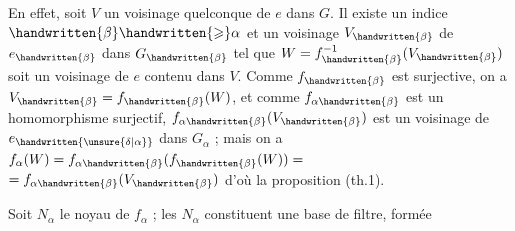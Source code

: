 En effet, soit $V$ un voisinage quelconque de $e$ dans $G$. Il existe un
indice $\handwritten{\beta}\handwritten{\geqslant}\alpha$ et un voisinage $V_{\handwritten{\beta}}$ de $e_{\handwritten{\beta}}$ dans $G_{\handwritten{\beta}}$ tel que $W=f^{-1}_{\handwritten{\beta}}(V_{\handwritten{\beta}})$
soit un voisinage de $e$ contenu dans $V$. Comme $f_{\handwritten{\beta}}$ est surjective, on a
$V_{\handwritten{\beta}}=f_{\handwritten{\beta}}(W)$, et comme $f_{\alpha\handwritten{\beta}}$ est un homomorphisme surjectif, $f_{\alpha\handwritten{\beta}}(V_{\handwritten{\beta}})$
est un voisinage de $e_{\handwritten{\unsure{\delta|\alpha}}}$ dans $G_\alpha$ ; mais on a $f_\alpha(W)=f_{\alpha\handwritten{\beta}}(f_{\handwritten{\beta}}(W))=$
$=f_{\alpha\handwritten{\beta}}(V_{\handwritten{\beta}})$ d'où la proposition (th.1).

Soit $N_\alpha$ le noyau de $f_\alpha$ ; les $N_\alpha$ constituent une base de filtre, formée
